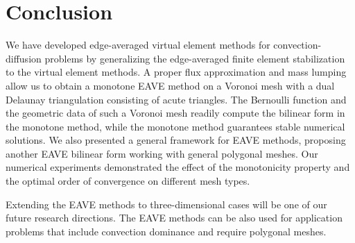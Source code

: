 \documentclass[a4paper]{article}
\theoremstyle{plain}
\theoremstyle{definition}
\numberwithin{equation}{section}
\begin{document}
\section{Conclusion}
\label{sec: conclusion}
We have developed edge-averaged virtual element methods for convection-diffusion problems by generalizing the edge-averaged finite element  stabilization~\cite{XU99} to the virtual element methods. A proper flux approximation and mass lumping allow us to obtain a monotone EAVE method on a Voronoi mesh with a dual Delaunay triangulation consisting of acute triangles. The Bernoulli function and the geometric data of such a Voronoi mesh readily compute the bilinear form in the monotone method, while the monotone method guarantees stable numerical solutions. We also presented a general framework for EAVE methods, proposing another EAVE bilinear form working with general polygonal meshes. Our numerical experiments demonstrated the effect of the monotonicity property and the optimal order of convergence on different mesh types.

Extending the EAVE methods to three-dimensional cases will be one of our future research directions. The EAVE methods can be also used for application problems that include convection dominance and require polygonal meshes.



	
	
	
\end{document}

